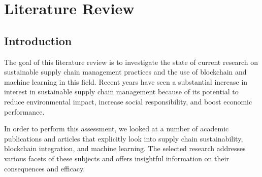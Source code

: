 \chapter{Literature Review}\doublespacing %

\label{Chapter2} %



\section{Introduction}
\noindent The goal of this literature review is to investigate the state of current research on sustainable supply chain management practices and the use of blockchain and machine learning in this field. Recent years have seen a substantial increase in interest in sustainable supply chain management because of its potential to reduce environmental impact, increase social responsibility, and boost economic performance.
\par In order to perform this assessment, we looked at a number of academic publications and articles that explicitly look into supply chain sustainability, blockchain integration, and machine learning. The selected research addresses various facets of these subjects and offers insightful information on their consequences and efficacy.

